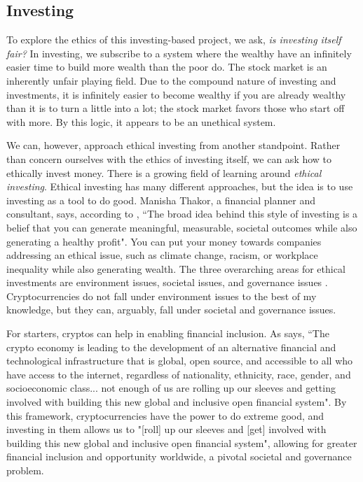 \documentclass[10pt,twocolumn]{article}
\begin{document}
\subsection{Investing}

To explore the ethics of this investing-based project, we ask, \textit{is investing itself fair?} In investing, we subscribe to a system where the wealthy have an infinitely easier time to build more wealth than the poor do. The stock market is an inherently unfair playing field. Due to the compound nature of investing and investments, it is infinitely easier to become wealthy if you are already wealthy than it is to turn a little into a lot; the stock market favors those who start off with more. By this logic, it appears to be an unethical system.

We can, however, approach ethical investing from another standpoint. Rather than concern ourselves with the ethics of investing itself, we can ask how to ethically invest money. There is a growing field of learning around \textit{ethical investing}. Ethical investing has many different approaches, but the idea is to use investing as a tool to do good. Manisha Thakor, a financial planner and consultant, says, according to , ``The broad idea behind this style of investing is a belief that you can generate meaningful, measurable, societal outcomes while also generating a healthy profit". You can put your money towards companies addressing an ethical issue, such as climate change, racism, or workplace inequality while also generating wealth. The three overarching areas for ethical investments are environment issues, societal issues, and governance issues \cite{LimitsOfEthicalInvesting}. Cryptocurrencies do not fall under environment issues to the best of my knowledge, but they can, arguably, fall under societal and governance issues.

For starters, cryptos can help in enabling financial inclusion. As  says, ``The crypto economy is leading to the development of an alternative financial and technological infrastructure that is global, open source, and accessible to all who have access to the internet, regardless of nationality, ethnicity, race, gender, and socioeconomic class... not enough of us are rolling up our sleeves and getting involved with building this new global and inclusive open financial system". By this framework, cryptocurrencies have the power to do extreme good, and investing in them allows us to "[roll] up our sleeves and [get] involved with building this new global and inclusive open financial system", allowing for greater financial inclusion and opportunity worldwide, a pivotal societal and governance problem.
\end{document}
